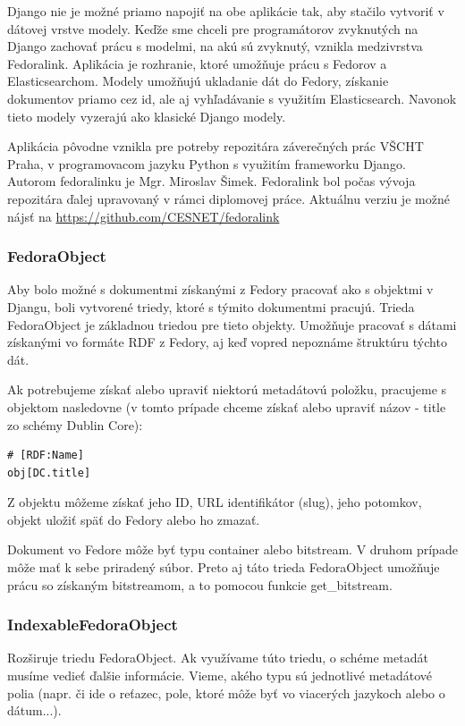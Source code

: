 \documentclass[thesis=M,slovak]{FITthesis}[2013/05/06]
\begin{document}
Django nie je možné priamo napojiť na obe aplikácie tak, aby stačilo vytvoriť v dátovej vrstve modely. Keďže sme chceli pre programátorov zvyknutých na Django zachovať prácu s modelmi, na akú sú zvyknutý, vznikla medzivrstva Fedoralink. Aplikácia je rozhranie, ktoré umožňuje prácu s Fedorov a Elasticsearchom. Modely umožňujú ukladanie dát do Fedory, získanie dokumentov priamo cez id, ale aj vyhľadávanie s využitím Elasticsearch. Navonok tieto modely vyzerajú ako klasické Django modely.

Aplikácia pôvodne vznikla pre potreby repozitára záverečných prác VŠCHT Praha, v programovacom jazyku Python s využitím frameworku Django. Autorom fedoralinku je Mgr. Miroslav Šimek. Fedoralink bol počas vývoja repozitára ďalej upravovaný v rámci diplomovej práce. Aktuálnu verziu je možné nájsť na \url{https://github.com/CESNET/fedoralink}

\subsubsection{FedoraObject}
Aby bolo možné s dokumentmi získanými z Fedory pracovať ako s objektmi v Djangu, boli vytvorené triedy, ktoré s týmito dokumentmi pracujú. Trieda FedoraObject je základnou triedou pre tieto objekty. Umožňuje pracovať s dátami získanými vo formáte RDF z Fedory, aj keď vopred nepoznáme štruktúru týchto dát.

Ak potrebujeme získať alebo upraviť niektorú metadátovú položku, pracujeme s objektom nasledovne (v tomto prípade chceme získať alebo upraviť názov - title zo schémy Dublin Core): 
\begin{lstlisting}[frame=single] 
# [RDF:Name]
obj[DC.title]
\end{lstlisting}

Z objektu môžeme získať jeho ID, URL identifikátor (slug), jeho potomkov, objekt uložiť späť do Fedory alebo ho zmazať.

Dokument vo Fedore môže byť typu container alebo bitstream. V druhom prípade môže mať k sebe priradený súbor. Preto aj táto trieda FedoraObject umožňuje prácu so získaným bitstreamom, a to pomocou funkcie get\_bitstream.

\subsubsection{IndexableFedoraObject}
Rozširuje triedu FedoraObject. Ak využívame túto triedu, o schéme metadát musíme vedieť ďalšie informácie. Vieme, akého typu sú jednotlivé metadátové polia (napr. či ide o reťazec, pole, ktoré môže byť vo viacerých jazykoch alebo o dátum...).
\end{document}

